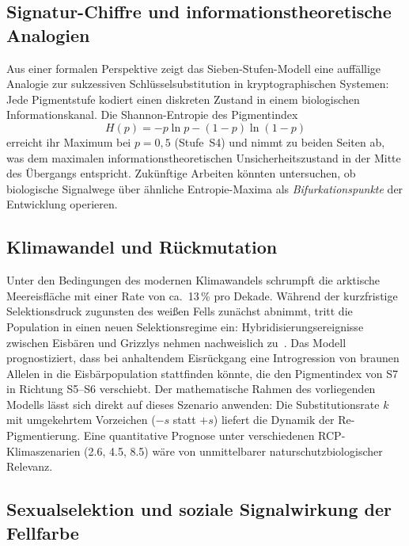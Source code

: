 ﻿\documentclass[12pt,a4paper]{article}
\theoremstyle{remark}
\begin{document}
\subsection{Signatur-Chiffre und informationstheoretische Analogien}

Aus einer formalen Perspektive zeigt das Sieben-Stufen-Modell eine auff\"{a}llige
Analogie zur sukzessiven Schl\"{u}sselsubstitution in kryptographischen
Systemen: Jede Pigmentstufe kodiert einen diskreten Zustand in einem
biologischen Informationskanal. Die Shannon-Entropie des Pigmentindex
\[
  H(p) = -p \ln p - (1-p)\ln(1-p)
\]
erreicht ihr Maximum bei $p = 0{,}5$ (Stufe~S4) und nimmt zu beiden Seiten ab,
was dem maximalen informationstheoretischen Unsicherheitszustand in der
Mitte des \"{U}bergangs entspricht. Zuk\"{u}nftige Arbeiten k\"{o}nnten
untersuchen, ob biologische Signalwege \"{u}ber \"{a}hnliche Entropie-Maxima
als \emph{Bifurkationspunkte} der Entwicklung operieren.

\subsection{Klimawandel und R\"{u}ckmutation}

Unter den Bedingungen des modernen Klimawandels schrumpft die arktische
Meereisfl\"{a}che mit einer Rate von ca.~13\,\% pro Dekade.
W\"{a}hrend der kurzfristige Selektionsdruck zugunsten des wei\ss{}en Fells
zun\"{a}chst abnimmt, tritt die Population in einen neuen Selektionsregime
ein: Hybridisierungsereignisse zwischen Eisb\"{a}ren und Grizzlys nehmen
nachweislich zu~\cite{rode2015}. Das Modell prognostiziert,
dass bei anhaltendem Eisr\"{u}ckgang eine Introgression von braunen
Allelen in die Eisb\"{a}rpopulation stattfinden k\"{o}nnte, die den
Pigmentindex von S7 in Richtung S5--S6 verschiebt.
Der mathematische Rahmen des vorliegenden Modells l\"{a}sst sich direkt
auf dieses Szenario anwenden: Die Substitutionsrate $k$ mit umgekehrtem
Vorzeichen ($-s$ statt $+s$) liefert die Dynamik der
Re-Pigmentierung. Eine quantitative Prognose unter verschiedenen
RCP-Klimaszenarien (2.6, 4.5, 8.5) w\"{a}re von unmittelbarer
naturschutzbiologischer Relevanz.

\subsection{Sexualselektion und soziale Signalwirkung der Fellfarbe}
\end{document}
